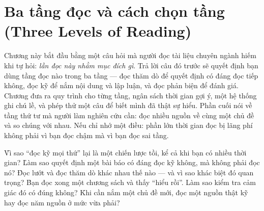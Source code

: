 \documentclass[../../english.tex]{subfiles}
\begin{document}
\chapter{Ba tầng đọc và cách chọn tầng (Three Levels of Reading)}

\begin{tomtat}
Chương này bắt đầu bằng một câu hỏi mà người đọc tài liệu chuyên ngành hiếm khi tự hỏi: \emph{lần đọc này nhằm mục đích gì}. Trả lời câu đó trước sẽ quyết định bạn dùng tầng đọc nào trong ba tầng --- đọc thăm dò để quyết định có đáng đọc tiếp không, đọc kỹ để nắm nội dung và lập luận, và đọc phản biện để đánh giá. Chương đưa ra quy trình cho từng tầng, ngân sách thời gian gợi ý, một hệ thống ghi chú lề, và phép thử một câu để biết mình đã thật sự hiểu. Phần cuối nói về tầng thứ tư mà người làm nghiên cứu cần: đọc nhiều nguồn về cùng một chủ đề và so chúng với nhau. Nếu chỉ nhớ một điều: phần lớn thời gian đọc bị lãng phí không phải vì bạn đọc chậm mà vì bạn đọc sai tầng.
\end{tomtat}

\begin{nentang}
\end{nentang}

\begin{khoigoi}
\h{Vì sao ``đọc kỹ mọi thứ'' lại là một chiến lược tồi, kể cả khi bạn có nhiều thời gian?}
\h{Làm sao quyết định một bài báo có đáng đọc kỹ không, mà không phải đọc nó?}
\h{Đọc lướt và đọc thăm dò khác nhau thế nào --- và vì sao khác biệt đó quan trọng?}
\h{Bạn đọc xong một chương sách và thấy ``hiểu rồi''. Làm sao kiểm tra cảm giác đó có đúng không?}
\h{Khi cần nắm một chủ đề mới, đọc một nguồn thật kỹ hay đọc năm nguồn ở mức vừa phải?}
\end{khoigoi}
\end{document}
